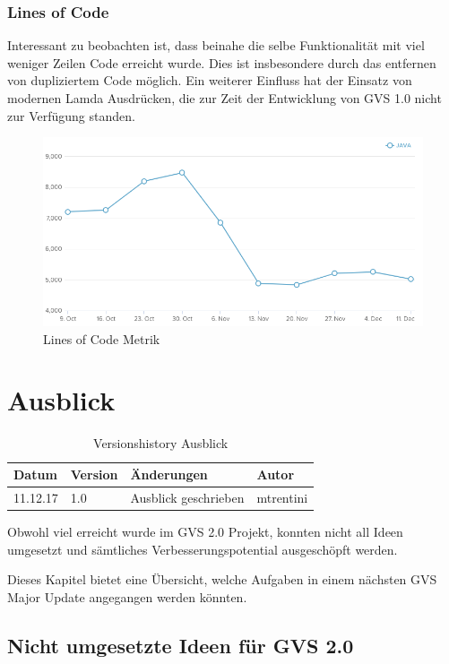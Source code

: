 \documentclass[11pt,a4paper,english,oneside]{book}
\numberwithin{equation}{chapter}
\begin{document}
	\subsection{Lines of Code} \label{ssec:lines-code}
	Interessant zu beobachten ist, dass beinahe die selbe Funktionalität mit viel weniger Zeilen Code erreicht wurde. Dies ist insbesondere durch das entfernen von dupliziertem Code möglich. Ein weiterer Einfluss hat der Einsatz von modernen Lamda Ausdrücken, die zur Zeit der Entwicklung von GVS 1.0 nicht zur Verfügung standen.
	\begin{figure}[h!]
		\centering
		\includegraphics[width=0.7\linewidth]{assets/images/metrics/lines_of_code}
		\caption{Lines of Code Metrik}
		\label{metric-linesofcode}
	\end{figure}	
	

	\chapter{Ausblick} \label{ch:ausblick}
	\begin{table}[h!]
		\centering
		\begin{tabularx}{\linewidth}{l l X l}
			\toprule 
			Datum & Version & Änderungen & Autor \\
			\midrule
			11.12.17 & 1.0 & Ausblick geschrieben & mtrentini \\
			\bottomrule 
		\end{tabularx} 
		\caption{Versionshistory Ausblick} 
	\end{table}
	
	Obwohl viel erreicht wurde im GVS 2.0 Projekt, konnten nicht all Ideen umgesetzt und sämtliches Verbesserungspotential ausgeschöpft werden.
	
	Dieses Kapitel bietet eine Übersicht, welche Aufgaben in einem nächsten GVS Major Update angegangen werden könnten. 
	
	\section{Nicht umgesetzte Ideen für GVS 2.0}
\end{document}
